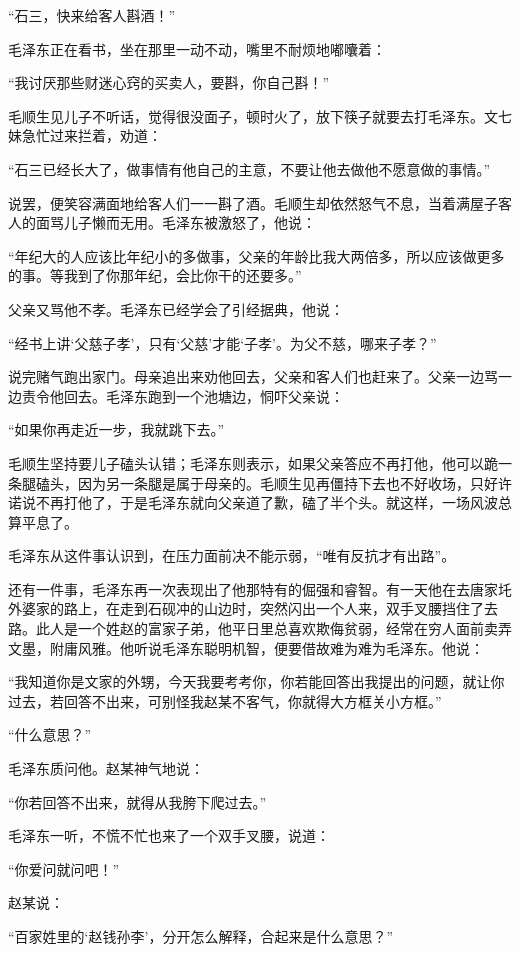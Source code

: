 \documentclass[../../dazhuan.tex]{subfiles}
\begin{document}
“石三，快来给客人斟酒！”

毛泽东正在看书，坐在那里一动不动，嘴里不耐烦地嘟囔着：

“我讨厌那些财迷心窍的买卖人，要斟，你自己斟！”

毛顺生见儿子不听话，觉得很没面子，顿时火了，放下筷子就要去打毛泽东。文七妹急忙过来拦着，劝道：

“石三已经长大了，做事情有他自己的主意，不要让他去做他不愿意做的事情。”

说罢，便笑容满面地给客人们一一斟了酒。毛顺生却依然怒气不息，当着满屋子客人的面骂儿子懒而无用。毛泽东被激怒了，他说：

“年纪大的人应该比年纪小的多做事，父亲的年龄比我大两倍多，所以应该做更多的事。等我到了你那年纪，会比你干的还要多。”

父亲又骂他不孝。毛泽东已经学会了引经据典，他说：

“经书上讲‘父慈子孝’，只有‘父慈’才能‘子孝’。为父不慈，哪来子孝？”

说完赌气跑出家门。母亲追出来劝他回去，父亲和客人们也赶来了。父亲一边骂一边责令他回去。毛泽东跑到一个池塘边，恫吓父亲说：

“如果你再走近一步，我就跳下去。”

毛顺生坚持要儿子磕头认错；毛泽东则表示，如果父亲答应不再打他，他可以跪一条腿磕头，因为另一条腿是属于母亲的。毛顺生见再僵持下去也不好收场，只好许诺说不再打他了，于是毛泽东就向父亲道了歉，磕了半个头。就这样，一场风波总算平息了。

毛泽东从这件事认识到，在压力面前决不能示弱，“唯有反抗才有出路”。

还有一件事，毛泽东再一次表现出了他那特有的倔强和睿智。有一天他在去唐家圫外婆家的路上，在走到石砚冲的山边时，突然闪出一个人来，双手叉腰挡住了去路。此人是一个姓赵的富家子弟，他平日里总喜欢欺侮贫弱，经常在穷人面前卖弄文墨，附庸风雅。他听说毛泽东聪明机智，便要借故难为难为毛泽东。他说：

“我知道你是文家的外甥，今天我要考考你，你若能回答出我提出的问题，就让你过去，若回答不出来，可别怪我赵某不客气，你就得大方框关小方框。”

“什么意思？”

毛泽东质问他。赵某神气地说：

“你若回答不出来，就得从我胯下爬过去。”

毛泽东一听，不慌不忙也来了一个双手叉腰，说道：

“你爱问就问吧！”

赵某说：

“百家姓里的‘赵钱孙李’，分开怎么解释，合起来是什么意思？”
\end{document}

